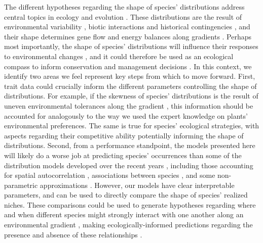 \documentclass[11pt, a4paper]{article}
\begin{document}
The different hypotheses regarding the shape of species' distributions address central topics in ecology and evolution \citep{sagarinAbundantCentreDistribution2002}. These distributions are the result of environmental variability \citep{helmuthClimateChangeLatitudinal2002, butterfieldEnvironmentalFilteringIncreases2015}, biotic interactions \citep{hastingsUnexpectedSpatialPatterns1997} and historical contingencies \citep{frickEmergingDiseaseCauses2010}, and their shape determines gene flow \citep{haldaneRelationDensityRegulation1956, lesicaWhenArePeripheral1995, pirononGeographicVariationGenetic2017} and energy balances along gradients \citep{hallDistributionAbundanceOrganisms1992}. Perhaps most importantly, the shape of species' distributions will influence their responses to environmental changes \citep{channellDynamicBiogeographyConservation2000}, and it could therefore be used as an ecological compass to inform conservation and management decisions \citep{channellTrajectoriesExtinctionSpatial2000}. In this context, we identify two areas we feel represent key steps from which to move forward. First, trait data could crucially inform the different parameters controlling the shape of distributions. For example, if the skewness of species' distributions is the result of uneven environmental tolerances along the gradient \citep{sundayGlobalAnalysisThermal2011}, this information should be accounted for analogously to the way we used the expert knowledge on plants' environmental preferences. The same is true for species' ecological strategies, with aspects regarding their competitive ability potentially informing the shape of distributions. Second, from a performance standpoint, the models presented here will likely do a worse job at predicting species' occurrences than some of the distribution models developed over the recent years \citep{norbergComprehensiveEvaluationPredictive2019}, including those accounting for spatial autocorrelation \citep{ovaskainenUncoveringHiddenSpatial2016}, associations between species \citep{tikhonovJointSpeciesDistribution2020}, and some non-parametric approximations \citep{harrisGeneratingRealisticAssemblages2015}. However, our models have clear interpretable parameters, and can be used to directly compare the shape of species' realized niches. These comparisons could be used to generate hypotheses regarding where and when different species might strongly interact with one another along an environmental gradient \citep{louthanWhereWhenSpecies2015}, making ecologically-informed predictions regarding the presence and absence of these relationships \citep{callawayPositiveInteractionsAlpine2002, heGlobalShiftsPositive2013}.
\end{document}

